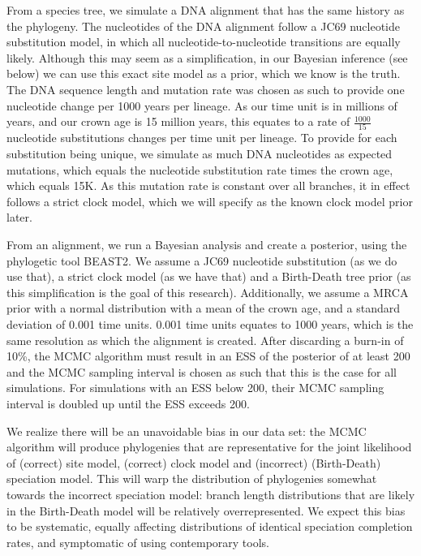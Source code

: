 \documentclass{article}
\begin{document}
From a species tree, we simulate a DNA alignment that has the same history
as the phylogeny. The nucleotides of the DNA alignment follow a JC69
nucleotide substitution model, in which all nucleotide-to-nucleotide transitions
are equally likely. Although this may seem as a simplification, in our Bayesian
inference (see below) we can use this exact site model as a prior, which we 
know is the truth.
The DNA sequence length and mutation rate was chosen as such to provide one
nucleotide change per 1000 years per lineage. As our time unit is in 
millions of years, and our crown age is 15 million years,
this equates to a rate of $\frac{1000}{15}$ nucleotide substitutions 
changes per time unit per lineage. To provide for each substitution being unique,
we simulate as much DNA nucleotides as expected mutations, which equals the
nucleotide substitution rate times the crown age, which equals 15K. As this
mutation rate is constant over all branches, it in effect follows a strict 
clock model, which we will specify as the known clock model prior later.

From an alignment, we run a Bayesian analysis and create a posterior, 
using the phylogetic tool BEAST2. We assume a
JC69 nucleotide substitution (as we do use that), a strict clock model (as
we have that) and a Birth-Death tree prior (as this simplification is the goal
of this research). Additionally, we assume a MRCA prior with a normal distribution
with a mean of the crown age, and a standard deviation of 0.001 time units. 0.001
time units equates to 1000 years, which is the same resolution as which the
alignment is created. After discarding a burn-in of 10\%, the MCMC algorithm must 
result in an ESS of the posterior of at least 200 and the MCMC sampling interval is 
chosen as such that this is the case for all simulations. For simulations
with an ESS below 200, their MCMC sampling interval is doubled up until
the ESS exceeds 200. 

We realize there will be an unavoidable bias in our data set: the MCMC
algorithm will produce phylogenies that are representative for the joint
likelihood of (correct) site model, (correct) clock model and 
(incorrect) (Birth-Death) speciation model. This will
warp the distribution of phylogenies somewhat towards the incorrect
speciation model: branch length distributions that are likely in the
Birth-Death model will be relatively overrepresented. We expect
this bias to be systematic, equally affecting distributions
of identical speciation completion rates, and symptomatic
of using contemporary tools.
\end{document}
